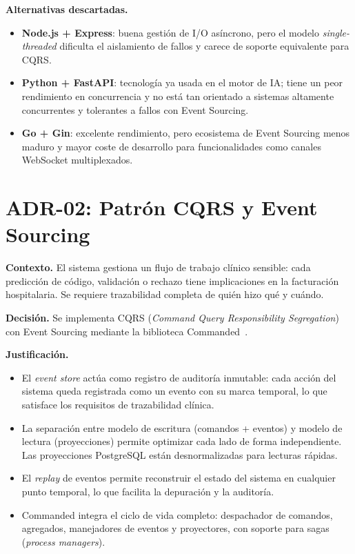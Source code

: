 \textbf{Alternativas descartadas.}
\begin{itemize}
    \item \textbf{Node.js + Express}: buena gestión de I/O asíncrono, pero el modelo \emph{single-threaded} dificulta el aislamiento de fallos y carece de soporte equivalente para CQRS.
    \item \textbf{Python + FastAPI}: tecnología ya usada en el motor de IA; tiene un peor rendimiento en concurrencia y no está tan orientado a sistemas altamente concurrentes y tolerantes a fallos con Event Sourcing.
    \item \textbf{Go + Gin}: excelente rendimiento, pero ecosistema de Event Sourcing menos maduro y mayor coste de desarrollo para funcionalidades como canales WebSocket multiplexados.
\end{itemize}

\section{ADR-02: Patrón CQRS y Event Sourcing}

\textbf{Contexto.} El sistema gestiona un flujo de trabajo clínico sensible: cada predicción de código, validación o rechazo tiene implicaciones en la facturación hospitalaria. Se requiere trazabilidad completa de quién hizo qué y cuándo.

\textbf{Decisión.} Se implementa CQRS (\emph{Command Query Responsibility Segregation}) con Event Sourcing mediante la biblioteca Commanded~\cite{commanded2024}.

\textbf{Justificación.}
\begin{itemize}
    \item El \emph{event store} actúa como registro de auditoría inmutable: cada acción del sistema queda registrada como un evento con su marca temporal, lo que satisface los requisitos de trazabilidad clínica.
    \item La separación entre modelo de escritura (comandos + eventos) y modelo de lectura (proyecciones) permite optimizar cada lado de forma independiente. Las proyecciones PostgreSQL están desnormalizadas para lecturas rápidas.
    \item El \emph{replay} de eventos permite reconstruir el estado del sistema en cualquier punto temporal, lo que facilita la depuración y la auditoría.
    \item Commanded integra el ciclo de vida completo: despachador de comandos, agregados, manejadores de eventos y proyectores, con soporte para sagas (\emph{process managers}).
\end{itemize}

